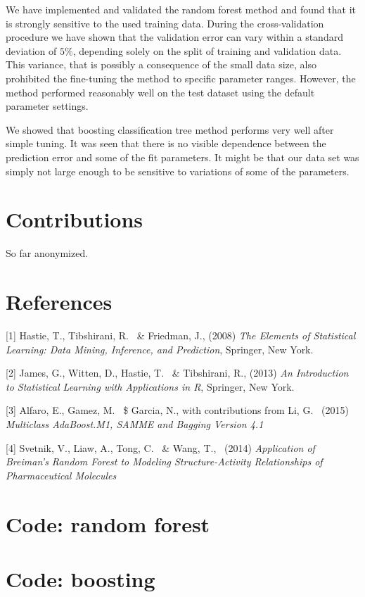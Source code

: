 \documentclass{article}
\begin{document}
We have implemented and validated the random forest method and found that it is strongly sensitive to the used training data. During the cross-validation procedure we have shown that the validation error can vary within a standard deviation of $5\%$, depending solely on the split of training and validation data. This variance, that is possibly a consequence of the small data size,  also prohibited the fine-tuning the method to specific parameter ranges. However, the method performed reasonably well on the test dataset using the default parameter settings.

We showed that boosting classification tree method performs very well after simple tuning. It was seen that there is no visible dependence between the prediction error and some of the fit parameters. It might be that our data set was simply not large enough to be sensitive to variations of some of the parameters.


\section{Contributions}

So far anonymized.


\section*{References}

\small

[1] Hastie, T., Tibshirani, R. \ \& Friedman, J., (2008) {\it The Elements of Statistical Learning: Data Mining, Inference, and Prediction}, Springer, New York.

[2] James, G., Witten, D., Hastie, T. \ \& Tibshirani, R., (2013) {\it An Introduction to Statistical Learning
with Applications in R}, Springer, New York.

[3] Alfaro, E., Gamez, M. \ \$ Garcia, N., with contributions from Li, G. \ (2015) {\it Multiclass AdaBoost.M1, SAMME and Bagging Version 4.1}

[4] Svetnik, V., Liaw, A., Tong, C. \ \& Wang, T., \ (2014) {\it Application of Breiman’s Random Forest to Modeling  Structure-Activity  Relationships  of  Pharmaceutical  Molecules}

\appendix

\section{Code: random forest}




\section{Code: boosting}

\end{document}
